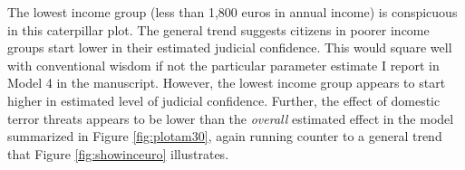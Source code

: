 \documentclass[11pt,]{article}
\begin{document}
The lowest income group (less than 1,800 euros in annual income) is
conspicuous in this caterpillar plot. The general trend suggests
citizens in poorer income groups start lower in their estimated judicial
confidence. This would square well with conventional wisdom if not the
particular parameter estimate I report in Model 4 in the manuscript.
However, the lowest income group appears to start higher in estimated
level of judicial confidence. Further, the effect of domestic terror
threats appears to be lower than the \emph{overall} estimated effect in
the model summarized in Figure \ref{fig:plotam30}, again running counter
to a general trend that Figure \ref{fig:showinceuro} illustrates.

\newpage

\newpage
\singlespacing 

\end{document}
